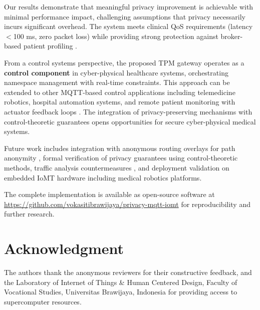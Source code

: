 \documentclass[conference]{IEEEtran}
\begin{document}
Our results demonstrate that meaningful privacy improvement is achievable with minimal performance impact, challenging assumptions that privacy necessarily incurs significant overhead. The system meets clinical QoS requirements (latency $<$100 ms, zero packet loss) while providing strong protection against broker-based patient profiling \cite{collusion_defender, mqtt_data_integrity}.

From a control systems perspective, the proposed TPM gateway operates as a \textbf{control component} in cyber-physical healthcare systems, orchestrating namespace management with real-time constraints. This approach can be extended to other MQTT-based control applications including telemedicine robotics, hospital automation systems, and remote patient monitoring with actuator feedback loops \cite{telemedicine_robot, hospital_automation}. The integration of privacy-preserving mechanisms with control-theoretic guarantees opens opportunities for secure cyber-physical medical systems.

Future work includes integration with anonymous routing overlays for path anonymity \cite{iot_onion_routing}, formal verification of privacy guarantees using control-theoretic methods, traffic analysis countermeasures \cite{dl_intrusion_iot}, and deployment validation on embedded IoMT hardware including medical robotics platforms.

The complete implementation is available as open-source software at \url{https://github.com/vokasitibrawijaya/privacy-mqtt-iomt} for reproducibility and further research.

\section*{Acknowledgment}

The authors thank the anonymous reviewers for their constructive feedback, and the Laboratory of Internet of Things \& Human Centered Design, Faculty of Vocational Studies, Universitas Brawijaya, Indonesia for providing access to supercomputer resources.
\end{document}
